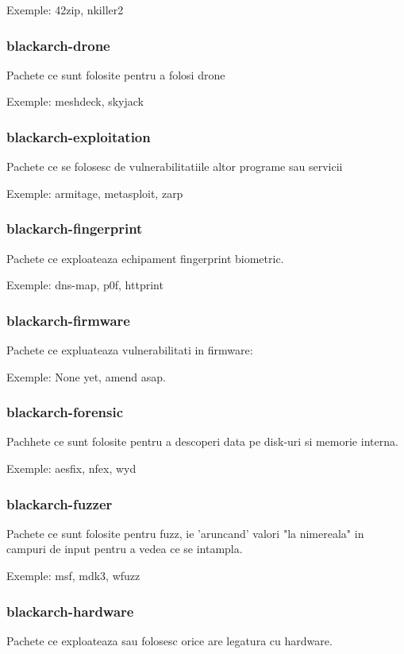 \documentclass[a4paper, oneside, 11pt]{book}
\begin{document}
Exemple: 42zip, nkiller2

\subsubsection{blackarch-drone}
Pachete ce sunt folosite pentru a folosi drone

Exemple: meshdeck, skyjack

\subsubsection{blackarch-exploitation}
Pachete ce se folosesc de vulnerabilitatiile altor programe sau servicii

Exemple: armitage, metasploit, zarp

\subsubsection{blackarch-fingerprint}
Pachete ce exploateaza  echipament fingerprint biometric.

Exemple: dns-map, p0f, httprint

\subsubsection{blackarch-firmware}
Pachete ce expluateaza vulnerabilitati in firmware:

Exemple: None yet, amend asap.

\subsubsection{blackarch-forensic}
Pachhete ce sunt folosite pentru a descoperi data pe disk-uri si memorie interna.

Exemple: aesfix, nfex, wyd

\subsubsection{blackarch-fuzzer}
Pachete ce sunt folosite pentru fuzz, ie
'aruncand' valori "la nimereala" in campuri de input pentru a vedea ce se intampla.

Exemple: msf, mdk3, wfuzz

\subsubsection{blackarch-hardware}
Pachete ce exploateaza sau folosesc orice are legatura cu hardware.
\end{document}
